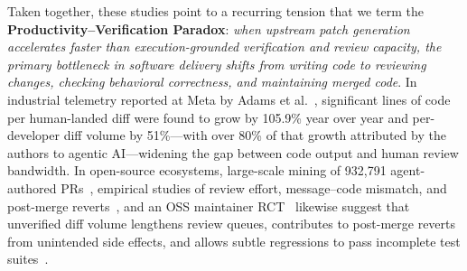 \documentclass[10pt,twocolumn,a4paper]{article}
\begin{document}
Taken together, these studies point to a recurring tension that we term the \textbf{Productivity--Verification Paradox}: \emph{when upstream patch generation accelerates faster than execution-grounded verification and review capacity, the primary bottleneck in software delivery shifts from writing code to reviewing changes, checking behavioral correctness, and maintaining merged code}. In industrial telemetry reported at Meta by Adams et al.~\cite{adams2026automating}, significant lines of code per human-landed diff were found to grow by 105.9\% year over year and per-developer diff volume by 51\%---with over 80\% of that growth attributed by the authors to agentic AI---widening the gap between code output and human review bandwidth. In open-source ecosystems, large-scale mining of 932,791 agent-authored PRs~\cite{li2026aidev}, empirical studies of review effort, message--code mismatch, and post-merge reverts~\cite{watanabe2025use,gong2026analyzing,ehsani2026where,oukhay2026code,chowdhury2026industry,milanese2026humanagent}, and an OSS maintainer RCT~\cite{becker2025measuring} likewise suggest that unverified diff volume lengthens review queues, contributes to post-merge reverts from unintended side effects, and allows subtle regressions to pass incomplete test suites~\cite{aleithan2026swebench,wang2025solved}.
\end{document}
